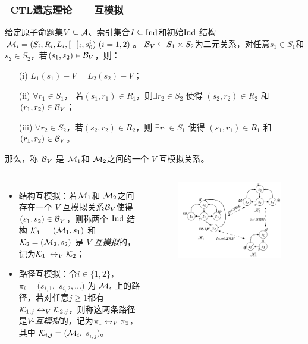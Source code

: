\documentclass[9pt, CJK]{beamer}
\begin{document}
	\begin{frame} 
		\frametitle{~CTL遗忘理论——{\footnotesize 互模拟}}
		{\scriptsize 
			\begin{definition}[$V$-互模拟]
				\label{def:VInd:bisimulation}
				给定原子命题集$V\subseteq\cal A$、索引集合$I\subseteq \textrm{Ind}$和初始$\textrm{Ind}$-结构 ${\cal M}_i=(S_i, R_i,L_i, [\_]_i, s_0^i)~(i=1,2)$。
				${\cal B}_V \subseteq S_1 \times S_2$为二元关系，对任意$s_1 \in S_1$和$s_2 \in S_2$，若$(s_1, s_2)\in {\cal B}_V$，则：
				\begin{itemize}[<+-| alert@+>]
					\item[(i)] $L_1(s_1) - V = L_2(s_2) -V$；
					\item[(ii)] $\forall r_1\in S_1$， 若$(s_1, r_1)\in R_1$，则$\exists r_2 \in S_2$ 使得 $(s_2,r_2) \in R_2$ 和 $(r_1, r_2) \in {\cal B}_V$；
					\item[(iii)] $\forall r_2\in S_2$，若$(s_2, r_2)\in R_2$，则 $\exists r_1 \in S_1$ 使得 $(s_1,r_1) \in R_1$ 和 $(r_1, r_2)\in {\cal B}_V$。
				\end{itemize}
				那么，称 ${\cal B}_V$ 是 ${\cal M}_1$和 ${\cal M}_2$之间的一个 $V$-互模拟关系。
			\end{definition}
			\begin{columns}
			\begin{itemize}
				\item 结构互模拟：若${\cal M}_1$和 ${\cal M}_2$之间存在一个 $V$-互模拟关系${\cal B}_V$使得$(s_1, s_2)\in {\cal B}_V$，则称两个 $\textrm{Ind}$-结构 ${\cal K}_1$ $= ({\cal M}_1, s_1)$ 和 ${\cal K}_2 = ({\cal M}_2, s_2)$ 是 $V$-{\em 互模拟}的，记为${\cal K}_1$ $\leftrightarrow_V {\cal K}_2$；
				\item 路径互模拟：令$i\in \{1,2\}$，$\pi_i=(s_{i,1},$ $s_{i,2},\ldots)$ 为 ${\cal M}_i$ 上的路径，若对任意$j \ge 1$都有$ {\cal K}_{1,j} \leftrightarrow_V {\cal K}_{2,j}$，则称这两条路径是$V$-{\em 互模拟}的，记为$\pi_1 \leftrightarrow_V \pi_2$，其中 ${\cal K}_{i,j}=({\cal M}_i,$ $s_{i,j})$。
			\end{itemize}
			\begin{figure}
				\includegraphics[scale=0.34]{figures/NVBnewCar1}

\end{figure}
\end{columns}}
\end{frame}
\end{document}
